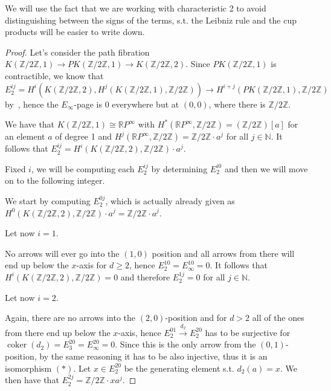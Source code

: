 \documentclass{article}
\newcommand{\numberset}{\mathbb}
\newcommand{\N}{\numberset{N}}
\newcommand{\Z}{\numberset{Z}}
\newcommand{\R}{\numberset{R}}
\newcommand{\RP}{\R P^\infty}
\newcommand{\exercise}[1]{\noindent {\bf Exercise #1}}
\DeclareMathOperator{\coker}{coker}
\begin{document}
\title{}

\author{Matteo Durante, s2303760, Leiden University}

\maketitle

\exercise{2}

    We will use the fact that we are working with characteristic 2 to avoid
    distinguishing between the signs of the terms, s.t. the Leibniz rule and the
    cup products will be easier to write down.

\begin{proof}
    Let's consider the path fibration $K(\Z/2\Z,1)\rightarrow
    PK(\Z/2\Z,1)\rightarrow K(\Z/2\Z,2)$. Since $PK(\Z/2\Z,1)$ is contractible,
    we know that $E^{ij}_2=H^i(K(\Z/2\Z,2),H^j(K(\Z/2\Z,1),\Z/2\Z))\rightarrow
    H^{i+j}(PK(\Z/2\Z,1),\Z/2\Z)$ by~\cite[thm. 9.5]{HM19}, hence the
    $E_\infty$-page is 0 everywhere but at $(0,0)$, where there is $\Z/2\Z$.

    We have that $K(\Z/2\Z,1)\cong\RP$ with $H^*(\RP,\Z/2\Z)=(\Z/2\Z)[a]$ for an
    element $a$ of degree 1 and $H^j(\RP,\Z/2\Z)=\Z/2\Z\cdot a^j$ for all
    $j\in\N$. It follows that $E^{ij}_2=H^i(K(\Z/2\Z,2),\Z/2\Z)\cdot a^j$.

    Fixed $i$, we will be computing each $E^{ij}_2$ by determining $E^{i0}_2$
    and then we will move on to the following integer.

    We start by computing $E^{0j}_2$, which is actually already given as
    $H^0(K(\Z/2\Z,2),\Z/2\Z)\cdot a^j=\Z/2\Z\cdot a^j$.

    Let now $i=1$.
    
    No arrows will ever go into the $(1,0)$ position and all arrows from there
    will end up below the $x$-axis for $d\geq 2$, hence
    $E^{10}_2=E^{10}_\infty=0$. It follows that $H^i(K(\Z/2\Z,2),\Z/2\Z)=0$ and
    therefore $E^{1j}_2=0$ for all $j\in\N$.

    Let now $i=2$.

    Again, there are no arrows into the $(2,0)$-position and for $d>2$ all of
    the ones from there end up below the $x$-axis, hence
    $E^{01}_2\xrightarrow{d_2}E^{20}_2$ has to be surjective for
    $\coker(d_2)=E^{20}_3=E^{20}_\infty=0$. Since this is the only arrow from
    the $(0,1)$-position, by the same reasoning it has to be also injective,
    thus it is an isomorphism $(*)$. Let $x\in E^{20}_2$ be the generating
    element s.t. $d_2(a)=x$. We then have that $E^{2j}_2=\Z/2\Z\cdot xa^j$.
    

\end{proof}
\end{document}
